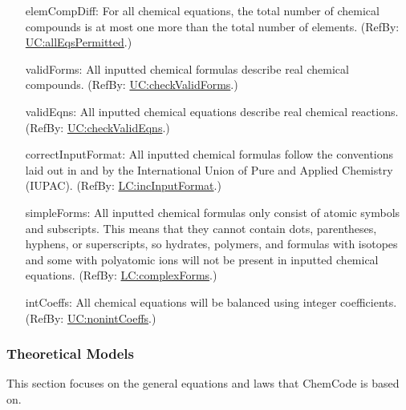 \documentclass[12pt]{article}
\begin{document}
\begin{itemize}
\item[elemCompDiff:\phantomsection\label{elemCompDiff}]{For all chemical equations, the total number of chemical compounds is at most one more than the total number of elements. (RefBy: \hyperref[allEqsPermitted]{UC:allEqsPermitted}.)}
\item[validForms:\phantomsection\label{validForms}]{All inputted chemical formulas describe real chemical compounds. (RefBy: \hyperref[checkValidForms]{UC:checkValidForms}.)}
\item[validEqns:\phantomsection\label{validEqns}]{All inputted chemical equations describe real chemical reactions. (RefBy: \hyperref[checkValidEqns]{UC:checkValidEqns}.)}
\item[correctInputFormat:\phantomsection\label{correctInputFormat}]{All inputted chemical formulas follow the conventions laid out in \cite{inorganicIUPAC} and \cite{organicIUPAC} by the International Union of Pure and Applied Chemistry (IUPAC). (RefBy: \hyperref[incInputFormat]{LC:incInputFormat}.)}
\item[simpleForms:\phantomsection\label{simpleForms}]{All inputted chemical formulas only consist of atomic symbols and subscripts. This means that they cannot contain dots, parentheses, hyphens, or superscripts, so hydrates, polymers, and formulas with isotopes and some with polyatomic ions will not be present in inputted chemical equations. (RefBy: \hyperref[complexForms]{LC:complexForms}.)}
\item[intCoeffs:\phantomsection\label{intCoeffs}]{All chemical equations will be balanced using integer coefficients. (RefBy: \hyperref[nonintCoeffs]{UC:nonintCoeffs}.)}
\end{itemize}
\subsubsection{Theoretical Models}
\label{Sec:TMs}
This section focuses on the general equations and laws that ChemCode is based on.
\end{document}
